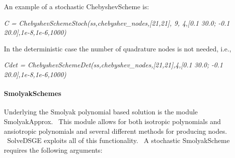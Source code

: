 \documentclass[notitlepage,11pt]{article}
\begin{document}
\bigskip

An example of a stochastic ChebyshevScheme is:

\bigskip

\textit{C = ChebyshevSchemeStoch(ss,chebyshev\_nodes,[21,21], 9, 4,[0.1
30.0; -0.1 20.0],1e-8,1e-6,1000)}

\bigskip

In the deterministic case the number of quadrature nodes is not needed, i.e.,

\bigskip

\textit{Cdet = ChebyshevSchemeDet(ss,chebyshev\_nodes,[21,21],4,[0.1 30.0;
-0.1 20.0],1e-8,1e-6,1000)}

\paragraph{SmolyakSchemes}

Underlying the Smolyak polynomial based solution is the module
SmolyakApprox. \ This module allows for both isotropic polynomials and
ansiotropic polynomials and several different methods for producing nodes. \
SolveDSGE exploits all of this functionality. \ A stochastic SmolyakScheme
requires the following arguments:
\end{document}
